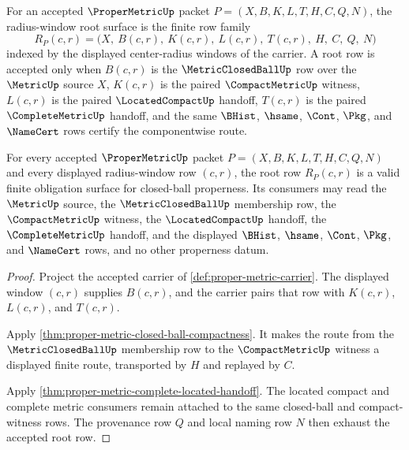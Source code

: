 \begin{definition}
\label{def:proper-metric-radius-window-root}
For an accepted $\ProperMetricUp$ packet $P=(X,B,K,L,T,H,C,Q,N)$, the radius-window root surface is the finite row family
$$
R_P(c,r)=\bigl(X,\ B(c,r),\ K(c,r),\ L(c,r),\ T(c,r),\ H,\ C,\ Q,\ N\bigr)
$$
indexed by the displayed center-radius windows of the carrier. A root row is accepted only when $B(c,r)$ is the $\MetricClosedBallUp$ row over the $\MetricUp$ source $X$, $K(c,r)$ is the paired $\CompactMetricUp$ witness, $L(c,r)$ is the paired $\LocatedCompactUp$ handoff, $T(c,r)$ is the paired $\CompleteMetricUp$ handoff, and the same $\BHist$, $\hsame$, $\Cont$, $\Pkg$, and $\NameCert$ rows certify the componentwise route.
\end{definition}

\begin{theorem}
\label{thm:proper-metric-radius-window-root-soundness}
For every accepted $\ProperMetricUp$ packet $P=(X,B,K,L,T,H,C,Q,N)$ and every displayed radius-window row $(c,r)$, the root row $R_P(c,r)$ is a valid finite obligation surface for closed-ball properness. Its consumers may read the $\MetricUp$ source, the $\MetricClosedBallUp$ membership row, the $\CompactMetricUp$ witness, the $\LocatedCompactUp$ handoff, the $\CompleteMetricUp$ handoff, and the displayed $\BHist$, $\hsame$, $\Cont$, $\Pkg$, and $\NameCert$ rows, and no other properness datum.
\end{theorem}
\begin{proof}
Project the accepted carrier of \autoref{def:proper-metric-carrier}. The displayed window $(c,r)$ supplies $B(c,r)$, and the carrier pairs that row with $K(c,r)$, $L(c,r)$, and $T(c,r)$.

Apply \autoref{thm:proper-metric-closed-ball-compactness}. It makes the route from the $\MetricClosedBallUp$ membership row to the $\CompactMetricUp$ witness a displayed finite route, transported by $H$ and replayed by $C$.

Apply \autoref{thm:proper-metric-complete-located-handoff}. The located compact and complete metric consumers remain attached to the same closed-ball and compact-witness rows. The provenance row $Q$ and local naming row $N$ then exhaust the accepted root row.
\end{proof}

